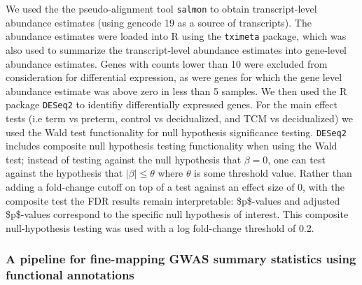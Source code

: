 We used the the pseudo-alignment tool \texttt{salmon}\cite{salmon} to obtain transcript-level abundance estimates (using gencode 19 as a source of transcripts). The abundance estimates were loaded into R 
using the \texttt{tximeta} package,\cite{tximeta} which was also used to summarize the transcript-level abundance estimates into gene-level abundance estimates.  Genes with counts lower than 10 were excluded from consideration
for differential expression, as were genes for which the gene level abundance estimate was above zero in less than 5 samples.  We then used the R package \texttt{DESeq2}\cite{DESeq2} to identifiy differentially expressed genes.  For the main effect tests (i.e term vs preterm, control vs decidualized, and TCM vs decidualized)  we used the Wald test functionality for null hypothesis significance testing.  \texttt{DESeq2} includes composite null hypothesis testing functionality when using the Wald test; instead of testing against the null hypothesis  that \(\beta =  0\), one can test against the hypothesis that \(\lvert \beta \rvert \leq \theta\) where \(\theta\) is some threshold value.  Rather than adding a fold-change cutoff on top of a test against an effect size of 0,  with the composite test the FDR results remain interpretable: \$p\$-values and adjusted \$p\$-values correspond to the specific null hypothesis of interest.  This composite null-hypothesis testing was used with a log fold-change threshold of 0.2.

\subsubsection{A pipeline for fine-mapping GWAS summary statistics using functional annotations}\label{sec:org24e3fbe}

